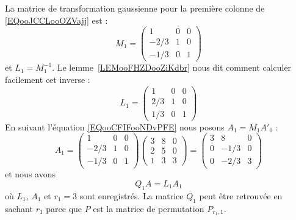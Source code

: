\begin{example}
	La matrice de transformation gaussienne pour la première colonne de \eqref{EQooJCCLooOZVajj} est :
	\begin{equation}
		M_1=\begin{pmatrix}
			1    & 0 & 0 \\
			-2/3 & 1 & 0 \\
			-1/3 & 0 & 1
		\end{pmatrix}
	\end{equation}
	et \( L_1=M_1^{-1}\). Le lemme~\ref{LEMooFHZDooZiKdbr} nous dit comment calculer facilement cet inverse :
	\begin{equation}
		L_1=\begin{pmatrix}
			1   & 0 & 0 \\
			2/3 & 1 & 0 \\
			1/3 & 0 & 1
		\end{pmatrix}
	\end{equation}
	En suivant l'équation \eqref{EQooCFIFooNDvPFE} nous posons \( A_1=M_1A'_0\) :
	\begin{equation}        \label{EQooUBRPooRJbCYn}
		A_1=
		\begin{pmatrix}
			1    & 0 & 0 \\
			-2/3 & 1 & 0 \\
			-1/3 & 0 & 1
		\end{pmatrix}
		\begin{pmatrix}
			3 & 8 & 0 \\
			2 & 5 & 0 \\
			1 & 3 & 3
		\end{pmatrix}=
		\begin{pmatrix}
			3 & 8    & 0 \\
			0 & -1/3 & 0 \\
			0 & -2/3 & 3
		\end{pmatrix}
	\end{equation}
	et nous avons
	\begin{equation}
		Q_1A=L_1A_1
	\end{equation}
	où \( L_1\), \( A_1\) et \( r_1=3\) sont enregistrés. La matrice \( Q_1\) peut être retrouvée en sachant \( r_1\) parce que \( P\) est la matrice de permutation \( P_{r_1,1}\).


\end{example}
